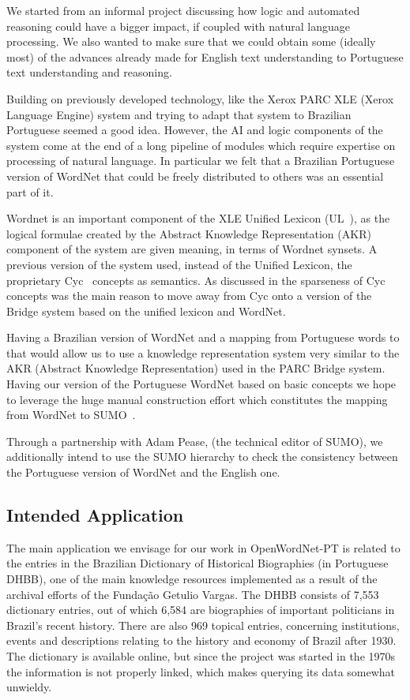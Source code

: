 \documentclass[a4paper,twocolumn]{article}
\begin{document}
We started from an informal project discussing how logic and automated
reasoning could have a bigger impact, if coupled with natural language
processing. We also wanted to make sure that we could obtain some
(ideally most) of the advances already made for English text
understanding to Portuguese text understanding and reasoning.

Building on previously developed technology, like the Xerox PARC XLE
(Xerox Language Engine) system and trying to adapt that system to
Brazilian Portuguese seemed a good idea.  However, the AI and logic
components of the system come at the end of a long pipeline of modules
which require expertise on processing of natural language. In
particular we felt that a Brazilian Portuguese version of WordNet that
could be freely distributed to others was an essential part of it.


Wordnet is an important component of the XLE Unified Lexicon
(UL~\cite{crouch2005}), as the logical formulae created by the
Abstract Knowledge Representation (AKR) component of the system are
given meaning, in terms of Wordnet synsets. A previous version of the
system used, instead of the Unified Lexicon, the proprietary
Cyc~\cite{cyc} concepts as semantics. As discussed in \cite{til2} the
sparseness of Cyc concepts was the main reason to move away from Cyc
onto a version of the Bridge system based on the unified lexicon and WordNet.

Having a Brazilian version of WordNet and a mapping from Portuguese
words to that would allow us to use a knowledge representation system
very similar to the AKR (Abstract Knowledge Representation) used in
the PARC Bridge system. Having our version of the Portuguese WordNet based
on basic concepts we hope to leverage the huge manual construction
effort which constitutes the mapping from WordNet to
SUMO~\cite{sumo-mapping}. 

Through a
partnership with Adam Pease, (the technical editor of SUMO), 
we additionally intend to use the SUMO hierarchy to
check the consistency between the Portuguese version of WordNet and
the English one.

\subsection{Intended Application}

The main application we envisage for our work in OpenWordNet-PT is
related to the entries in the Brazilian Dictionary of Historical
Biographies (in Portuguese DHBB), one of the main knowledge resources
implemented as a result of the archival efforts of the Funda\c{c}\~ao
Getulio Vargas.  The DHBB consists of 7,553 dictionary entries, out of
which 6,584 are biographies of important politicians in Brazil's
recent history. There are also 969 topical entries, concerning
institutions, events and descriptions relating to the history and
economy of Brazil after 1930. The dictionary is available 
online, but since the project was started in the 1970s the information
is not properly linked, which makes querying its data somewhat
unwieldy.
\end{document}
